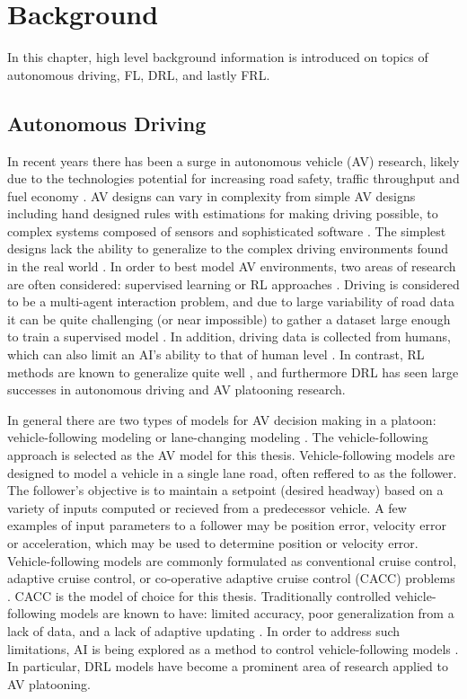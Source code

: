 \chapter{Background} \label{chap:background}
In this chapter, high level background information is introduced on topics of autonomous
driving, FL, DRL, and lastly FRL.

\section{Autonomous Driving}
In recent years there has been a surge in autonomous vehicle (AV) research, likely due
to the technologies potential for increasing road safety, traffic throughput and fuel
economy \cite{Makantasis2020a, Ye2019}. AV designs can vary in complexity from simple
AV designs including hand designed rules with estimations for making driving possible,
to complex systems composed of sensors and sophisticated software  \cite{Makantasis2020a}.
The simplest designs lack the ability to generalize to the complex driving environments
found in the real world \cite{Makantasis2020a}. In order to best model AV environments,
two areas of research are often considered: supervised learning or RL approaches
\cite{Makantasis2020a}.  Driving is considered to be a multi-agent interaction problem,
and due to large variability of road data it can be quite challenging (or near impossible)
to gather a dataset large enough to train a supervised model \cite{ElSallab2017a}.
In addition, driving data is collected from humans, which can also limit an AI's ability
to that of human level \cite{Ye2019}. In contrast, RL methods are known to generalize
quite well \cite{Makantasis2020a}, and furthermore DRL has seen
large successes in autonomous driving and AV platooning research.

In general there are two types of models for AV decision making in a platoon: vehicle-following
modeling or lane-changing modeling \cite{Ye2019}. The vehicle-following approach is
selected as the AV model for this thesis.  Vehicle-following
models are designed to model a vehicle in a single lane road, often reffered to as the follower. The follower's objective
is to maintain a setpoint (desired headway) based on a variety of inputs computed or recieved from a predecessor vehicle.
A few examples of input parameters to a follower may be position error, velocity error or acceleration,
which may be used to determine position or velocity error.
Vehicle-following models are commonly formulated as conventional cruise control,
adaptive cruise control, or co-operative adaptive cruise control (CACC) problems \cite{Mil2014}.
CACC is the model of choice for this thesis. Traditionally controlled vehicle-following models
are known to have: limited accuracy, poor generalization from a lack of data,
and a lack of adaptive updating \cite{Zhu2018}. In order to address such limitations,
AI is being explored as a method to control vehicle-following models \cite{Zhu2018}.
In particular, DRL models have become a prominent area of research applied to AV platooning.

